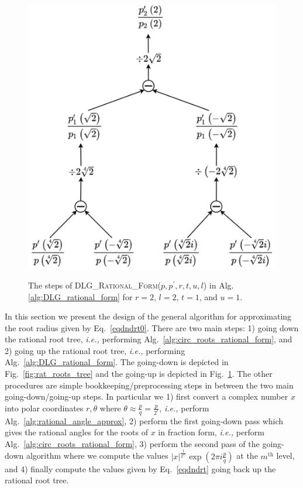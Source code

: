 \documentclass[runningheads]{llncs}
\begin{document}
\begin{figure}[h]
  \centering
  \includegraphics[width=0.8\linewidth]{p_prime.png}
  \caption{The steps of \textsc{DLG\_Rational\_Form}($p,p^\prime,r,t,u,l$) in Alg.\ref{alg:DLG_rational_form} for $r=2$, $l=2$, $t=1$, and $u=1$.}\label{fig:DLG}
  \caption{}
\end{figure}

In this section we present the design of the general algorithm for approximating the root radius given by Eq.~\ref{eqdndrt0}.
There are two main steps: 1) going down the rational root tree, \emph{i.e.,} performing Alg.~\ref{alg:circ_roots_rational_form}, and 2) going up the rational root tree, \emph{i.e.,} performing Alg.~\ref{alg:DLG_rational_form}. 
The going-down is depicted in Fig.~\ref{fig:rat_roots_tree} and the going-up is depicted in Fig.~\ref{fig:DLG}.
The other procedures are simple bookkeeping/preprocessing steps in between the two main going-down/going-up steps.
In particular we
1) first convert a complex number $x$ into polar coordinates $r,\theta$ where $\theta \approx \frac{p}{q} = \frac{p}{2^\epsilon}$, \emph{i.e.,} perform Alg.~\ref{alg:rational_angle_approx},
2) perform the first going-down pass which gives the rational angles for the roots of $x$ in fraction form, \emph{i.e.,} perform Alg.~\ref{alg:circ_roots_rational_form},
3) perform the second pass of the going-down algorithm where we compute the values $|x|^{\frac{1}{2^m}} \exp(2 \pi i \frac{p}{q})$ at the $m^\mathrm{th}$ level, and
4) finally compute the values given by Eq.~\ref{eqdndrt} going back up the rational root tree.
\end{document}
